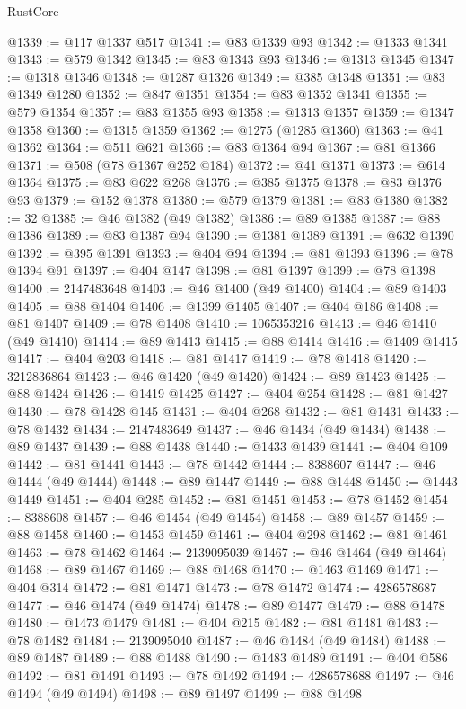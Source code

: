 \begin{lexlean}{RustCore}
\begin{coremodule}
@1339 := @117 @1337 @517
@1341 := @83 @1339 @93
@1342 := @1333 @1341
@1343 := @579 @1342
@1345 := @83 @1343 @93
@1346 := @1313 @1345
@1347 := @1318 @1346
@1348 := @1287 @1326
@1349 := @385 @1348
@1351 := @83 @1349 @1280
@1352 := @847 @1351
@1354 := @83 @1352 @1341
@1355 := @579 @1354
@1357 := @83 @1355 @93
@1358 := @1313 @1357
@1359 := @1347 @1358
@1360 := @1315 @1359
@1362 := @1275 (@1285 @1360)
@1363 := @41 @1362
@1364 := @511 @621
@1366 := @83 @1364 @94
@1367 := @81 @1366
@1371 := @508 (@78 @1367 @252 @184)
@1372 := @41 @1371
@1373 := @614 @1364
@1375 := @83 @622 @268
@1376 := @385 @1375
@1378 := @83 @1376 @93
@1379 := @152 @1378
@1380 := @579 @1379
@1381 := @83 @1380
@1382 := 32
@1385 := @46 @1382 (@49 @1382)
@1386 := @89 @1385
@1387 := @88 @1386
@1389 := @83 @1387 @94
@1390 := @1381 @1389
@1391 := @632 @1390
@1392 := @395 @1391
@1393 := @404 @94
@1394 := @81 @1393
@1396 := @78 @1394 @91
@1397 := @404 @147
@1398 := @81 @1397
@1399 := @78 @1398
@1400 := 2147483648
@1403 := @46 @1400 (@49 @1400)
@1404 := @89 @1403
@1405 := @88 @1404
@1406 := @1399 @1405
@1407 := @404 @186
@1408 := @81 @1407
@1409 := @78 @1408
@1410 := 1065353216
@1413 := @46 @1410 (@49 @1410)
@1414 := @89 @1413
@1415 := @88 @1414
@1416 := @1409 @1415
@1417 := @404 @203
@1418 := @81 @1417
@1419 := @78 @1418
@1420 := 3212836864
@1423 := @46 @1420 (@49 @1420)
@1424 := @89 @1423
@1425 := @88 @1424
@1426 := @1419 @1425
@1427 := @404 @254
@1428 := @81 @1427
@1430 := @78 @1428 @145
@1431 := @404 @268
@1432 := @81 @1431
@1433 := @78 @1432
@1434 := 2147483649
@1437 := @46 @1434 (@49 @1434)
@1438 := @89 @1437
@1439 := @88 @1438
@1440 := @1433 @1439
@1441 := @404 @109
@1442 := @81 @1441
@1443 := @78 @1442
@1444 := 8388607
@1447 := @46 @1444 (@49 @1444)
@1448 := @89 @1447
@1449 := @88 @1448
@1450 := @1443 @1449
@1451 := @404 @285
@1452 := @81 @1451
@1453 := @78 @1452
@1454 := 8388608
@1457 := @46 @1454 (@49 @1454)
@1458 := @89 @1457
@1459 := @88 @1458
@1460 := @1453 @1459
@1461 := @404 @298
@1462 := @81 @1461
@1463 := @78 @1462
@1464 := 2139095039
@1467 := @46 @1464 (@49 @1464)
@1468 := @89 @1467
@1469 := @88 @1468
@1470 := @1463 @1469
@1471 := @404 @314
@1472 := @81 @1471
@1473 := @78 @1472
@1474 := 4286578687
@1477 := @46 @1474 (@49 @1474)
@1478 := @89 @1477
@1479 := @88 @1478
@1480 := @1473 @1479
@1481 := @404 @215
@1482 := @81 @1481
@1483 := @78 @1482
@1484 := 2139095040
@1487 := @46 @1484 (@49 @1484)
@1488 := @89 @1487
@1489 := @88 @1488
@1490 := @1483 @1489
@1491 := @404 @586
@1492 := @81 @1491
@1493 := @78 @1492
@1494 := 4286578688
@1497 := @46 @1494 (@49 @1494)
@1498 := @89 @1497
@1499 := @88 @1498

\end{coremodule}
\end{lexlean}
